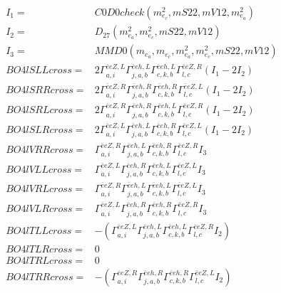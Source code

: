 \documentclass[A4,landscape]{article}
\begin{document}
\begin{align} 
I_1 = & C0D0check(m^2_{e_{{c}}}, mS22, mV12, m^2_{e_{{a}}}) \\ 
I_2 = & D_{27}(m^2_{e_{{a}}}, m^2_{e_{{c}}}, mS22, mV12) \\ 
I_3 = & MMD0(m_{e_{{a}}}, m_{e_{{c}}}, m^2_{e_{{a}}}, m^2_{e_{{c}}}, mS22, mV12) \\ 
  BO4lSLLcross= & 2  \Gamma^{\bar{e}e Z ,L}_{a, i} \Gamma^{\bar{e}e h ,L}_{j, a, b} \Gamma^{\bar{e}e h ,L}_{c, k, b} \Gamma^{\bar{e}e Z ,R}_{l, c} (I_1 - 2 I_2) \\ 
  BO4lSRRcross= & 2  \Gamma^{\bar{e}e Z ,R}_{a, i} \Gamma^{\bar{e}e h ,R}_{j, a, b} \Gamma^{\bar{e}e h ,R}_{c, k, b} \Gamma^{\bar{e}e Z ,L}_{l, c} (I_1 - 2 I_2) \\ 
  BO4lSRLcross= & 2  \Gamma^{\bar{e}e Z ,R}_{a, i} \Gamma^{\bar{e}e h ,R}_{j, a, b} \Gamma^{\bar{e}e h ,L}_{c, k, b} \Gamma^{\bar{e}e Z ,R}_{l, c} (I_1 - 2 I_2) \\ 
  BO4lSLRcross= & 2  \Gamma^{\bar{e}e Z ,L}_{a, i} \Gamma^{\bar{e}e h ,L}_{j, a, b} \Gamma^{\bar{e}e h ,R}_{c, k, b} \Gamma^{\bar{e}e Z ,L}_{l, c} (I_1 - 2 I_2) \\ 
  BO4lVRRcross= &  \Gamma^{\bar{e}e Z ,R}_{a, i} \Gamma^{\bar{e}e h ,L}_{j, a, b} \Gamma^{\bar{e}e h ,R}_{c, k, b} \Gamma^{\bar{e}e Z ,R}_{l, c} I_3 \\ 
  BO4lVLLcross= &  \Gamma^{\bar{e}e Z ,L}_{a, i} \Gamma^{\bar{e}e h ,R}_{j, a, b} \Gamma^{\bar{e}e h ,L}_{c, k, b} \Gamma^{\bar{e}e Z ,L}_{l, c} I_3 \\ 
  BO4lVRLcross= &  \Gamma^{\bar{e}e Z ,R}_{a, i} \Gamma^{\bar{e}e h ,L}_{j, a, b} \Gamma^{\bar{e}e h ,L}_{c, k, b} \Gamma^{\bar{e}e Z ,L}_{l, c} I_3 \\ 
  BO4lVLRcross= &  \Gamma^{\bar{e}e Z ,L}_{a, i} \Gamma^{\bar{e}e h ,R}_{j, a, b} \Gamma^{\bar{e}e h ,R}_{c, k, b} \Gamma^{\bar{e}e Z ,R}_{l, c} I_3 \\ 
  BO4lTLLcross= & -( \Gamma^{\bar{e}e Z ,L}_{a, i} \Gamma^{\bar{e}e h ,L}_{j, a, b} \Gamma^{\bar{e}e h ,L}_{c, k, b} \Gamma^{\bar{e}e Z ,R}_{l, c} I_2) \\ 
  BO4lTLRcross= & 0 \\ 
  BO4lTRLcross= & 0 \\ 
  BO4lTRRcross= & -( \Gamma^{\bar{e}e Z ,R}_{a, i} \Gamma^{\bar{e}e h ,R}_{j, a, b} \Gamma^{\bar{e}e h ,R}_{c, k, b} \Gamma^{\bar{e}e Z ,L}_{l, c} I_2) \\ 
\end{align} 
\end{document}
